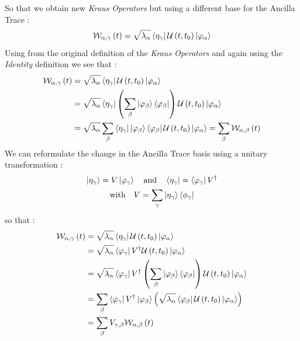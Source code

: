 \documentclass[a4paper,12pt]{article}
\begin{document}
So that we obtain new \textit{Kraus Operators} but using a different base for the Ancilla Trace  : 
\begin{equation}
	\mathcal{W}_{\alpha, \gamma} \left(t\right) = \sqrt{\lambda_{\alpha}} \bra{\eta_{\gamma}}  \mathcal{U}\left(t, t_0\right) \ket{\varphi_{\alpha}}
\end{equation}
Using from the original definition of the \textit{Kraus Operators} and again using the \textit{Identity} definition we see that : 
\begin{align}
	\mathcal{W}_{\alpha, \gamma} \left(t\right) &= \sqrt{\lambda_{\alpha}} \bra{\eta_{\gamma}} \mathcal{U}\left(t, t_0\right) \ket{\varphi_{\alpha}} \notag \\
	&= \sqrt{\lambda_{\alpha}} \bra{\eta_{\gamma}} \left( \sum_{\beta} \ket{\varphi_{\beta}} \bra{\varphi_{\beta}} \right) \mathcal{U}\left(t, t_0\right) \ket{\varphi_{\alpha}} \notag \\
	&= \sqrt{\lambda_{\alpha}} \sum_{\beta} \bra{\eta_{\gamma}} \ket{\varphi_{\beta}} \bra{\varphi_{\beta}} \mathcal{U}\left(t, t_0\right) \ket{\varphi_{\alpha}} = \sum_{\beta} \mathcal{W}_{\alpha, \beta} \left(t\right)
\end{align}
We can reformulate the change in the Ancilla Trace basis using a unitary transformation : 
\begin{gather}
	\ket{\eta_{\gamma}} = V \ket{\varphi_{\gamma}} \quad \text{and} \quad \bra{\eta_{\gamma}} = \bra{\varphi_{\gamma}} V^{\dagger} \\
	\text{with} \quad V = \sum_{\gamma}{\ket{\eta_{\gamma}} \bra{\phi_{\gamma}}}
\end{gather}
so that : 
\begin{align}
	\mathcal{W}_{\alpha, \gamma} \left(t\right) &= \sqrt{\lambda_{\alpha}} \bra{\eta_{\gamma}} \mathcal{U}\left(t, t_0\right) \ket{\varphi_{\alpha}} \notag \\
	&= \sqrt{\lambda_{\alpha}} \bra{\varphi_{\gamma}} V^{\dagger} \mathcal{U}\left(t, t_0\right) \ket{\varphi_{\alpha}} \notag \\
	&= \sqrt{\lambda_{\alpha}} \bra{\varphi_{\gamma}} V^{\dagger} \left( \sum_{\beta} \ket{\varphi_{\beta}} \bra{\varphi_{\beta}} \right) \mathcal{U}\left(t, t_0\right) \ket{\varphi_{\alpha}} \notag \\
	&= \sum_{\beta} \bra{\varphi_{\gamma}} V^{\dagger} \ket{\varphi_{\beta}} \left( \sqrt{\lambda_{\alpha}} \bra{\varphi_{\beta}} \mathcal{U}\left(t, t_0\right) \ket{\varphi_{\alpha}} \right) \notag \\
	&= \sum_{\beta} V_{\gamma, \beta} \mathcal{W}_{\alpha, \beta} \left(t\right)
\end{align}
\end{document}
